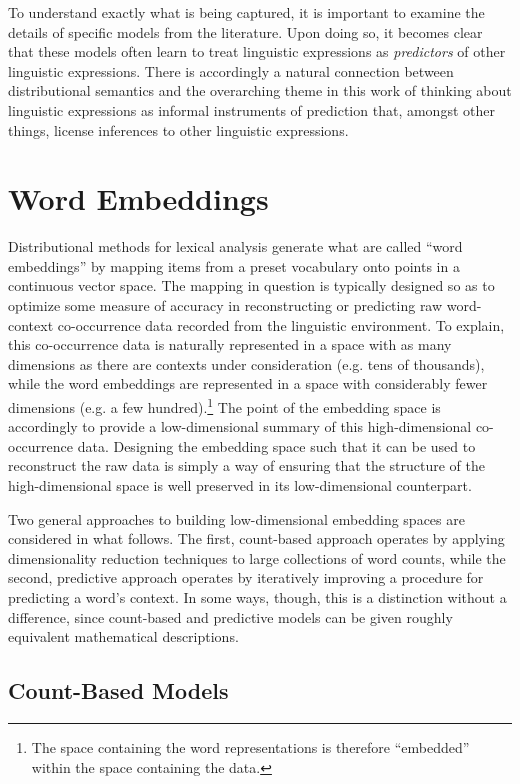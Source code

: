 To understand exactly what is being captured, it is important to examine the details of specific models from the literature. Upon doing so, it becomes clear that these models often learn to treat linguistic expressions as \textit{predictors} of other linguistic expressions. There is accordingly a natural connection between distributional semantics and the overarching theme in this work of thinking about linguistic expressions as informal instruments of prediction that, amongst other things, license inferences to other linguistic expressions.

\section{Word Embeddings}

Distributional methods for lexical analysis generate what are called ``word embeddings'' by mapping items from a preset vocabulary onto points in a continuous vector space. The mapping in question is typically designed so as to optimize some measure of accuracy in reconstructing or predicting raw word-context co-occurrence data recorded from the linguistic environment. To explain, this co-occurrence data is naturally represented in a space with as many dimensions as there are contexts under consideration (e.g. tens of thousands), while the word embeddings are represented in a space with considerably fewer dimensions (e.g. a few hundred).\footnote{The space containing the word representations is therefore ``embedded'' within the space containing the data.} The point of the embedding space is accordingly to provide a low-dimensional summary of this high-dimensional co-occurrence data. Designing the embedding space such that it can be used to reconstruct the raw data is simply a way of ensuring that the structure of the high-dimensional space is well preserved in its low-dimensional counterpart. 

Two general approaches to building low-dimensional embedding spaces are considered in what follows. The first, count-based approach operates by applying dimensionality reduction techniques to large collections of word counts, while the second, predictive approach operates by iteratively improving a procedure for predicting a word's context. In some ways, though, this is a distinction without a difference, since count-based and predictive models can be given roughly equivalent mathematical descriptions. 

\subsection{Count-Based Models}


